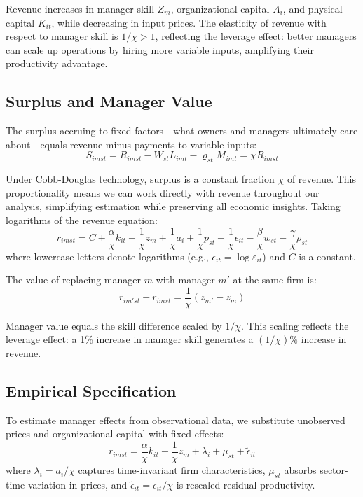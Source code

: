 \documentclass[11pt,a4paper]{article}
\begin{document}
Revenue increases in manager skill $Z_m$, organizational capital $A_i$, and physical capital $K_{it}$, while decreasing in input prices. The elasticity of revenue with respect to manager skill is $1/\chi > 1$, reflecting the leverage effect: better managers can scale up operations by hiring more variable inputs, amplifying their productivity advantage.

\subsection{Surplus and Manager Value}

The surplus accruing to fixed factors—what owners and managers ultimately care about—equals revenue minus payments to variable inputs:
\begin{equation}\label{eq:surplus}
S_{imst} = R_{imst} - W_{st}L_{imt} - \varrho_{st}M_{imt} = \chi R_{imst}
\end{equation}

Under Cobb-Douglas technology, surplus is a constant fraction $\chi$ of revenue. This proportionality means we can work directly with revenue throughout our analysis, simplifying estimation while preserving all economic insights. Taking logarithms of the revenue equation:
\begin{equation}\label{eq:log_revenue}
r_{imst} = C+\frac{\alpha}{\chi} k_{it} + \frac{1}{\chi} z_{m} + \frac{1}{\chi} a_i + \frac{1}{\chi} p_{st} + \frac{1}{\chi}\epsilon_{it} 
- \frac{\beta}{\chi} w_{st} - \frac{\gamma}{\chi} \rho_{st}
\end{equation}
where lowercase letters denote logarithms (e.g., $\epsilon_{it} = \log \varepsilon_{it}$) and $C$ is a constant.

The value of replacing manager $m$ with manager $m'$ at the same firm is:
\begin{equation}\label{eq:manager_value}
r_{im'st} - r_{imst} = \frac{1}{\chi}(z_{m'} - z_{m})
\end{equation}

Manager value equals the skill difference scaled by $1/\chi$. This scaling reflects the leverage effect: a 1\% increase in manager skill generates a $(1/\chi)\%$ increase in revenue.

\subsection{Empirical Specification}

To estimate manager effects from observational data, we substitute unobserved prices and organizational capital with fixed effects:
\begin{equation}\label{eq:empirical}
r_{imst} = \frac{\alpha}{\chi} k_{it} + \frac{1}{\chi}z_m + \lambda_i + \mu_{st} + \tilde{\epsilon}_{it}
\end{equation}
where $\lambda_i = a_i/\chi$ captures time-invariant firm characteristics, $\mu_{st}$ absorbs sector-time variation in prices, and $\tilde{\epsilon}_{it} = \epsilon_{it}/\chi$ is rescaled residual productivity.
\end{document}
